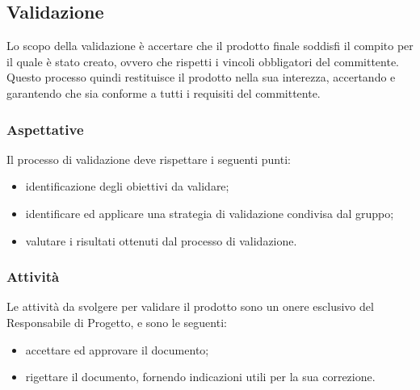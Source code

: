 \subsection{Validazione}
Lo scopo della validazione è accertare che il prodotto finale soddisfi il compito per il quale è stato creato, ovvero che rispetti i vincoli obbligatori del committente. Questo processo quindi restituisce il prodotto nella sua interezza, accertando e garantendo che sia conforme a tutti i requisiti del committente.

\subsubsection{Aspettative}
Il processo di validazione deve rispettare i seguenti punti:
\begin{itemize}
	\item identificazione degli obiettivi da validare;
	\item identificare ed applicare una strategia di validazione condivisa dal gruppo;
	\item valutare i risultati ottenuti dal processo di validazione.
\end{itemize}

\subsubsection{Attività}
Le attività da svolgere per validare il prodotto sono un onere esclusivo del Responsabile di Progetto, e sono le seguenti:
\begin{itemize}
	\item accettare ed approvare il documento;
	\item rigettare il documento, fornendo indicazioni utili per la sua correzione.
\end{itemize}


